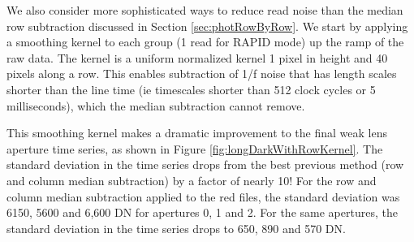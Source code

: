 \documentclass[]{aastex62}
\begin{document}
We also consider more sophisticated ways to reduce read noise than the median row subtraction discussed in Section \ref{sec:photRowByRow}.
We start by applying a smoothing kernel to each group (1 read for RAPID mode) up the ramp of the raw data.
The kernel is a uniform normalized kernel 1 pixel in height and 40 pixels along a row.
This enables subtraction of 1/f noise that has length scales shorter than the line time (ie timescales shorter than 512 clock cycles or 5 milliseconds), which the median subtraction cannot remove.

This smoothing kernel makes a dramatic improvement to the final weak lens aperture time series, as shown in Figure \ref{fig:longDarkWithRowKernel}.
The standard deviation in the time series drops from the best previous method (row and column median subtraction) by a factor of nearly 10!
For the row and column median subtraction applied to the red files, the standard deviation was 6150, 5600 and 6,600 DN for apertures 0, 1 and 2.
For the same apertures, the standard deviation in the time series drops to 650, 890 and 570 DN.
\end{document}
